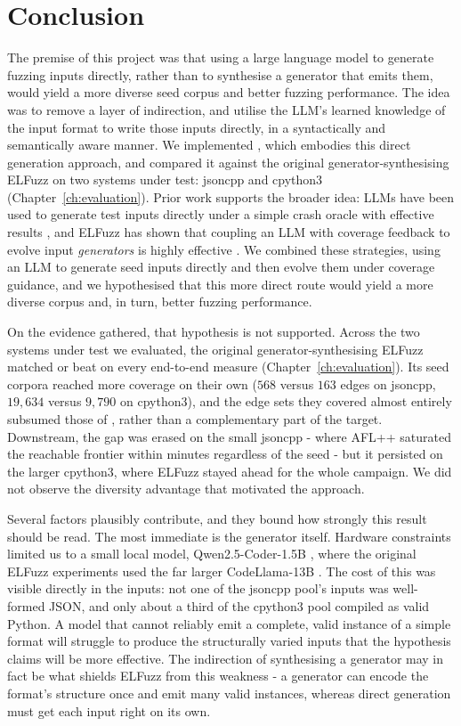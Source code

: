 \chapter{Conclusion}
\label{ch:conclusion}

The premise of this project was that using a large language model to generate fuzzing inputs directly, rather than to synthesise a generator that emits them, would yield a more diverse seed corpus and better fuzzing performance. The idea was to remove a layer of indirection, and utilise the LLM's learned knowledge of the input format to write those inputs directly, in a syntactically and semantically aware manner. We implemented \toolname{}, which embodies this direct generation approach, and compared it against the original generator-synthesising ELFuzz on two systems under test: jsoncpp and cpython3 (Chapter~\ref{ch:evaluation}). Prior work supports the broader idea: LLMs have been used to generate test inputs directly under a simple crash oracle with effective results \cite{xia_2023_universal,lin_2025_lmfuzz}, and ELFuzz has shown that coupling an LLM with coverage feedback to evolve input \emph{generators} is highly effective \cite{chen_2025_elfuzz}. We combined these strategies, using an LLM to generate seed inputs directly and then evolve them under coverage guidance, and we hypothesised that this more direct route would yield a more diverse corpus and, in turn, better fuzzing performance.

On the evidence gathered, that hypothesis is not supported. Across the two systems under test we evaluated, the original generator-synthesising ELFuzz matched or beat \toolname{} on every end-to-end measure (Chapter~\ref{ch:evaluation}). Its seed corpora reached more coverage on their own ($568$ versus $163$ edges on jsoncpp, $19{,}634$ versus $9{,}790$ on cpython3), and the edge sets they covered almost entirely subsumed those of \toolname{}, rather than a complementary part of the target. Downstream, the gap was erased on the small jsoncpp - where AFL++ saturated the reachable frontier within minutes regardless of the seed - but it persisted on the larger cpython3, where ELFuzz stayed ahead for the whole campaign. We did not observe the diversity advantage that motivated the approach.

Several factors plausibly contribute, and they bound how strongly this result should be read. The most immediate is the generator itself. Hardware constraints limited us to a small local model, Qwen2.5-Coder-1.5B \cite{hui_2024_qwen25coder}, where the original ELFuzz experiments used the far larger CodeLlama-13B \cite{rozire_2024_code,chen_2025_elfuzz}. The cost of this was visible directly in the inputs: not one of the jsoncpp pool's inputs was well-formed JSON, and only about a third of the cpython3 pool compiled as valid Python. A model that cannot reliably emit a complete, valid instance of a simple format will struggle to produce the structurally varied inputs that the hypothesis claims will be more effective. The indirection of synthesising a generator may in fact be what shields ELFuzz from this weakness - a generator can encode the format's structure once and emit many valid instances, whereas direct generation must get each input right on its own.

